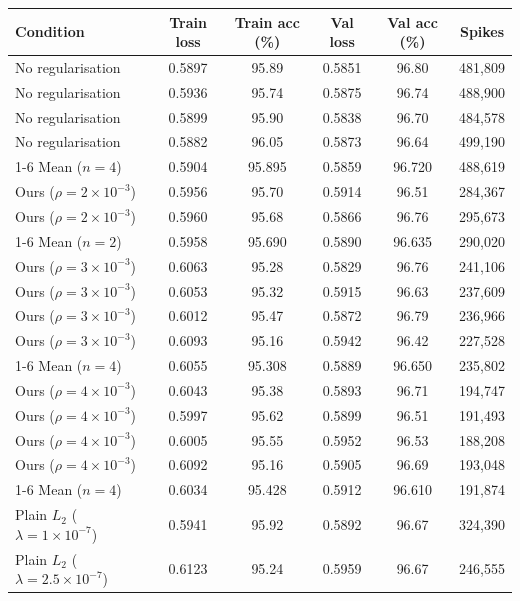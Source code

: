 \begin{table}
\centering
\small
\begin{tabular}{lccccc}
\toprule
Condition & Train loss & Train acc (\%) & Val loss & Val acc (\%) & Spikes \\
\midrule
No regularisation & 0.5897 & 95.89 & 0.5851 & 96.80 & 481,809 \\
No regularisation & 0.5936 & 95.74 & 0.5875 & 96.74 & 488,900 \\
No regularisation & 0.5899 & 95.90 & 0.5838 & 96.70 & 484,578 \\
No regularisation & 0.5882 & 96.05 & 0.5873 & 96.64 & 499,190 \\
\cmidrule{1-6}
Mean ($n=4$) & 0.5904 & 95.895 & 0.5859 & 96.720 & 488,619 \\
\midrule
Ours ($\rho=2\times10^{-3}$) & 0.5956 & 95.70 & 0.5914 & 96.51 & 284,367 \\
Ours ($\rho=2\times10^{-3}$) & 0.5960 & 95.68 & 0.5866 & 96.76 & 295,673 \\
\cmidrule{1-6}
Mean ($n=2$) & 0.5958 & 95.690 & 0.5890 & 96.635 & 290,020 \\
\midrule
Ours ($\rho=3\times10^{-3}$) & 0.6063 & 95.28 & 0.5829 & 96.76 & 241,106 \\
Ours ($\rho=3\times10^{-3}$) & 0.6053 & 95.32 & 0.5915 & 96.63 & 237,609 \\
Ours ($\rho=3\times10^{-3}$) & 0.6012 & 95.47 & 0.5872 & 96.79 & 236,966 \\
Ours ($\rho=3\times10^{-3}$) & 0.6093 & 95.16 & 0.5942 & 96.42 & 227,528 \\
\cmidrule{1-6}
Mean ($n=4$) & 0.6055 & 95.308 & 0.5889 & 96.650 & 235,802 \\
\midrule
Ours ($\rho=4\times10^{-3}$) & 0.6043 & 95.38 & 0.5893 & 96.71 & 194,747 \\
Ours ($\rho=4\times10^{-3}$) & 0.5997 & 95.62 & 0.5899 & 96.51 & 191,493 \\
Ours ($\rho=4\times10^{-3}$) & 0.6005 & 95.55 & 0.5952 & 96.53 & 188,208 \\
Ours ($\rho=4\times10^{-3}$) & 0.6092 & 95.16 & 0.5905 & 96.69 & 193,048 \\
\cmidrule{1-6}
Mean ($n=4$) & 0.6034 & 95.428 & 0.5912 & 96.610 & 191,874 \\
\midrule
Plain $L_2$ ($\lambda=1\times10^{-7}$) & 0.5941 & 95.92 & 0.5892 & 96.67 & 324,390 \\
\midrule
Plain $L_2$ ($\lambda=2.5\times10^{-7}$) & 0.6123 & 95.24 & 0.5959 & 96.67 & 246,555 \\

\end{tabular}
\end{table}
